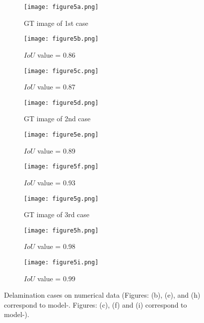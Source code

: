 \begin{figure} [!h]
	\centering
	\begin{subfigure}[b]{0.32\textwidth}
		\centering
		\texttt{[image: figure5a.png]}
		\caption{GT image of 1st case}
		\label{fig:num_GT_391}
	\end{subfigure}
	\hfill
	\begin{subfigure}[b]{0.32\textwidth}
		\centering
		\texttt{[image: figure5b.png]} 
		\caption{\(IoU\) value = 0.86}
		\label{fig:Convlstm_num_391}
	\end{subfigure}
	\hfill
	\begin{subfigure}[b]{0.32\textwidth}
		\centering
		\texttt{[image: figure5c.png]}
		\caption{\(IoU\) value =  0.87}
		\label{fig:AE_num_391}
	\end{subfigure}
	\par\medskip
	\begin{subfigure}[b]{0.32\textwidth}
		\centering
		\texttt{[image: figure5d.png]}
		\caption{GT image of 2nd case}
		\label{fig:num_GT_462}
	\end{subfigure}
	\hfill
	\begin{subfigure}[b]{0.32\textwidth}
		\centering
		\texttt{[image: figure5e.png]}
		\caption{\(IoU\) value = 0.89}
		\label{fig:Convlstm_num_462}
	\end{subfigure}
	\hfill
	\begin{subfigure}[b]{0.32\textwidth}
		\centering
		\texttt{[image: figure5f.png]}
		\caption{\(IoU\) value = 0.93}
		\label{fig:AE_num_462}
	\end{subfigure}
	\par\medskip
	\begin{subfigure}[b]{0.32\textwidth}
		\centering
		\texttt{[image: figure5g.png]}
		\caption{GT image of 3rd case}
		\label{fig:num_GT_453}
	\end{subfigure}
	\hfill	
	\begin{subfigure}[b]{0.32\textwidth}
		\centering
		\texttt{[image: figure5h.png]}
		\caption{\(IoU\) value = 0.98 }
		\label{fig:Convlstm_num_453}
	\end{subfigure}
	\hfill	
	\begin{subfigure}[b]{0.32\textwidth}
		\centering
		\texttt{[image: figure5i.png]}
		\caption{\(IoU\) value = 0.99}
		\label{fig:AE_num_453}
	\end{subfigure}
	\caption{Delamination cases on numerical data (Figures: (b), (e), and (h) correspond to model-. 
		Figures: (c), (f) and (i) correspond to model-).}
	\label{fig:num_case}
\end{figure} 
\clearpage
